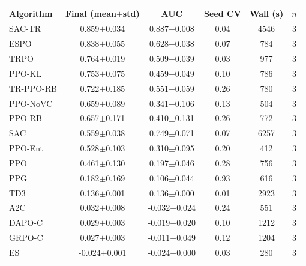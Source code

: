 \begin{tabular}{lccccc}
\toprule
Algorithm & Final (mean$\pm$std) & AUC & Seed CV & Wall (s) & $n$ \\
\midrule
SAC-TR & 0.859$\pm$0.034 & 0.887$\pm$0.008 & 0.04 & 4546 & 3 \\
ESPO & 0.838$\pm$0.055 & 0.628$\pm$0.038 & 0.07 & 784 & 3 \\
TRPO & 0.764$\pm$0.019 & 0.509$\pm$0.039 & 0.03 & 977 & 3 \\
PPO-KL & 0.753$\pm$0.075 & 0.459$\pm$0.049 & 0.10 & 786 & 3 \\
TR-PPO-RB & 0.722$\pm$0.185 & 0.551$\pm$0.059 & 0.26 & 780 & 3 \\
PPO-NoVC & 0.659$\pm$0.089 & 0.341$\pm$0.106 & 0.13 & 504 & 3 \\
PPO-RB & 0.657$\pm$0.171 & 0.410$\pm$0.131 & 0.26 & 772 & 3 \\
SAC & 0.559$\pm$0.038 & 0.749$\pm$0.071 & 0.07 & 6257 & 3 \\
PPO-Ent & 0.528$\pm$0.103 & 0.310$\pm$0.095 & 0.20 & 412 & 3 \\
PPO & 0.461$\pm$0.130 & 0.197$\pm$0.046 & 0.28 & 756 & 3 \\
PPG & 0.182$\pm$0.169 & 0.106$\pm$0.044 & 0.93 & 616 & 3 \\
TD3 & 0.136$\pm$0.001 & 0.136$\pm$0.000 & 0.01 & 2923 & 3 \\
A2C & 0.032$\pm$0.008 & -0.032$\pm$0.024 & 0.24 & 551 & 3 \\
DAPO-C & 0.029$\pm$0.003 & -0.019$\pm$0.020 & 0.10 & 1212 & 3 \\
GRPO-C & 0.027$\pm$0.003 & -0.011$\pm$0.049 & 0.12 & 1204 & 3 \\
ES & -0.024$\pm$0.001 & -0.024$\pm$0.000 & 0.03 & 280 & 3 \\
\bottomrule
\end{tabular}